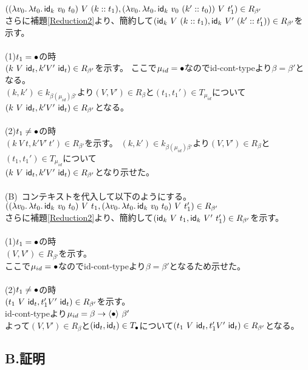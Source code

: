 $(\LamP{v_0}{\Lam{t_0}{\Idk\ v_0\ t_0}}\ V\ (\Cons{k}{t_1}),
\LamP{v_0}{\Lam{t_0}{\Idk\ v_0\ (\Cons{k'}{t_0})}}\ V\ t_1')\in R_{\beta'}$\\
さらに補題\ref{Reduction2}より、簡約して$(\Idk\ V\ (\Cons{k}{t_1}),\Idk\ V'\ (\Cons{k'}{t_1'}))\in R_{\beta'}$を示す。\\
\\
(1)$t_1=\bullet$の時\\
$(k\ V\ \textsf{id}_t,k' V'\ \textsf{id}_t)\in R_{\beta'}$を示す。
ここで$\mu_{id}=\bullet$なので\textsf{id-cont-type}より$\beta=\beta'$となる。\\
$(k,k')\in k_{\beta(\mu_{id})\beta'}$より$(V,V')\in R_{\beta}$と$(t_1,t_1')\in T_{\mu_{id}}$について\\
$(k\ V\ \textsf{id}_t,k' V'\ \textsf{id}_t)\in R_{\beta'}$となる。\\
\\
(2)$t_1 \neq \bullet$の時\\
$(k\ V\ t,k' V'\ t')\in R_{\beta'}$を示す。
$(k,k')\in k_{\beta(\mu_{id})\beta'}$より$(V,V')\in R_{\beta}$と$(t_1,t_1')\in T_{\mu_{id}}$について\\
$(k\ V\ \textsf{id}_t,k' V'\ \textsf{id}_t)\in R_{\beta'}$となり示せた。\\
\\
(B)\ コンテキストを代入して以下のようにする。\\
$(\LamP{v_0}{\Lam{t_0}{\Idk\ v_0\ t_0}}\ V\ t_1,
\LamP{v_0}{\Lam{t_0}{\Idk\ v_0\ t_0}}\ V\ t_1')\in R_{\beta'}$\\
さらに補題\ref{Reduction2}より、簡約して$(\textsf{id}_k\ V\ t_1,\textsf{id}_k\ V'\ t_1')\in R_{\beta'}$を示す。\\
\\
(1)$t_1=\bullet$の時\\
$(V,V')\in R_{\beta'}$を示す。\\
ここで$\mu_{id}=\bullet$なので\textsf{id-cont-type}より$\beta=\beta'$となるため示せた。\\
\\
(2)$t_1 \neq \bullet$の時\\
$(t_1\ V\ \textsf{id}_t,t_1' V'\ \textsf{id}_t)\in R_{\beta'}$を示す。\\
\textsf{id-cont-type}より$\mu_{id}=\beta \rightarrow \langle\bullet\rangle\ \beta'$\\
よって$(V,V')\in R_{\beta}$と$(\textsf{id}_t,\textsf{id}_t)\in T_{\bullet}$について$(t_1\ V\ \textsf{id}_t,t_1' V'\ \textsf{id}_t)\in R_{\beta'}$となる。

\subsection*{B.証明}

